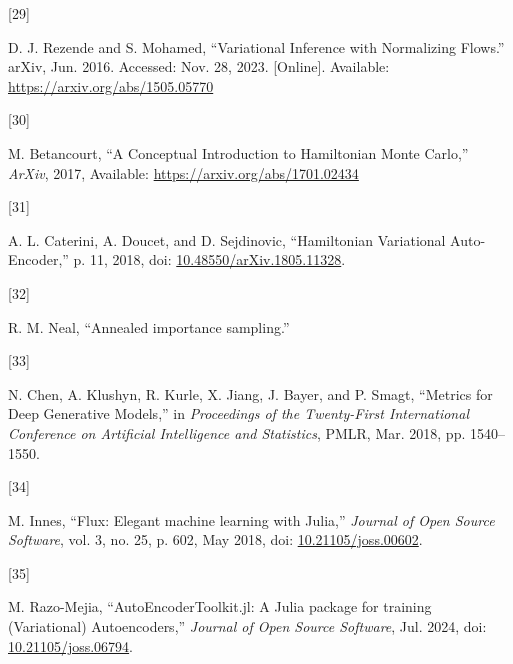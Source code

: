 \documentclass[
]{scrartcl}
\newlength{\cslhangindent}
\newlength{\csllabelwidth}
\newenvironment{CSLReferences}[2] %
 {\begin{list}{}{%
  \setlength{\itemindent}{0pt}
  \setlength{\leftmargin}{0pt}
  \setlength{\parsep}{0pt}
  \ifodd #1
   \setlength{\leftmargin}{\cslhangindent}
   \setlength{\itemindent}{-1\cslhangindent}
  \fi
  \setlength{\itemsep}{#2\baselineskip}}}
 {\end{list}}
\newcommand{\CSLLeftMargin}[1]{\parbox[t]{\csllabelwidth}{\strut#1\strut}}
\newcommand{\CSLRightInline}[1]{\parbox[t]{\linewidth - \csllabelwidth}{\strut#1\strut}}
\begin{document}
\begin{CSLReferences}{0}{0}
\CSLLeftMargin{{[}29{]} }%
\CSLRightInline{D. J. Rezende and S. Mohamed, {``Variational {Inference}
with {Normalizing Flows}.''} arXiv, Jun. 2016. Accessed: Nov. 28, 2023.
{[}Online{]}. Available: \url{https://arxiv.org/abs/1505.05770}}

\CSLLeftMargin{{[}30{]} }%
\CSLRightInline{M. Betancourt, {``A {Conceptual Introduction} to
{Hamiltonian Monte Carlo},''} \emph{ArXiv}, 2017, Available:
\url{https://arxiv.org/abs/1701.02434}}

\CSLLeftMargin{{[}31{]} }%
\CSLRightInline{A. L. Caterini, A. Doucet, and D. Sejdinovic,
{``Hamiltonian {Variational Auto-Encoder},''} p. 11, 2018, doi:
\href{https://doi.org/10.48550/arXiv.1805.11328}{10.48550/arXiv.1805.11328}.}

\CSLLeftMargin{{[}32{]} }%
\CSLRightInline{R. M. Neal, {``Annealed importance sampling.''}}

\CSLLeftMargin{{[}33{]} }%
\CSLRightInline{N. Chen, A. Klushyn, R. Kurle, X. Jiang, J. Bayer, and
P. Smagt, {``Metrics for {Deep Generative Models},''} in
\emph{Proceedings of the {Twenty-First International Conference} on
{Artificial Intelligence} and {Statistics}}, PMLR, Mar. 2018, pp.
1540--1550.}

\CSLLeftMargin{{[}34{]} }%
\CSLRightInline{M. Innes, {``Flux: {Elegant} machine learning with
{Julia},''} \emph{Journal of Open Source Software}, vol. 3, no. 25, p.
602, May 2018, doi:
\href{https://doi.org/10.21105/joss.00602}{10.21105/joss.00602}.}

\CSLLeftMargin{{[}35{]} }%
\CSLRightInline{M. Razo-Mejia, {``{AutoEncoderToolkit}.jl: {A Julia}
package for training ({Variational}) {Autoencoders},''} \emph{Journal of
Open Source Software}, Jul. 2024, doi:
\href{https://doi.org/10.21105/joss.06794}{10.21105/joss.06794}.}

\end{CSLReferences}
\end{document}
